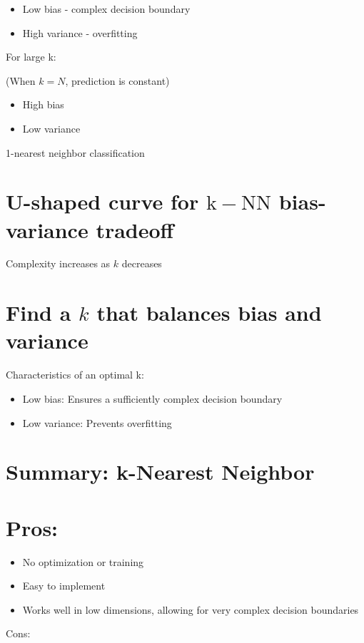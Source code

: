 \begin{itemize}
  \item Low bias - complex decision boundary
  \item High variance - overfitting
\end{itemize}

For large k:

(When $k=N$, prediction is constant)

\begin{itemize}
  \item High bias
  \item Low variance
\end{itemize}


1-nearest neighbor classification

\section*{U-shaped curve for $\mathrm{k}-\mathrm{NN}$ bias-variance tradeoff}

Complexity increases as $k$ decreases

\section*{Find a $k$ that balances bias and variance}
Characteristics of an optimal k:

\begin{itemize}
  \item Low bias: Ensures a sufficiently complex decision boundary
  \item Low variance: Prevents overfitting
\end{itemize}


\section*{Summary: k-Nearest Neighbor}
\section*{Pros:}
\begin{itemize}
  \item No optimization or training
  \item Easy to implement
  \item Works well in low dimensions, allowing for very complex decision boundaries
\end{itemize}

Cons:

